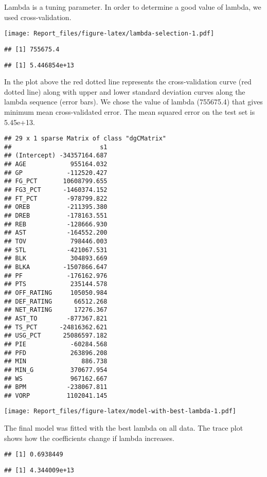 \documentclass[
]{article}
\begin{document}
Lambda is a tuning parameter. In order to determine a good value of
lambda, we used cross-validation.

\texttt{[image: Report\_files/figure-latex/lambda-selection-1.pdf]}

\begin{verbatim}
## [1] 755675.4
\end{verbatim}

\begin{verbatim}
## [1] 5.446854e+13
\end{verbatim}

In the plot above the red dotted line represents the cross-validation
curve (red dotted line) along with upper and lower standard deviation
curves along the lambda sequence (error bars). We chose the value of
lambda (755675.4) that gives minimum mean cross-validated error. The
mean squared error on the test set is 5.45e+13.

\begin{verbatim}
## 29 x 1 sparse Matrix of class "dgCMatrix"
##                        s1
## (Intercept) -34357164.687
## AGE            955164.032
## GP            -112520.427
## FG_PCT       10608799.655
## FG3_PCT      -1460374.152
## FT_PCT        -978799.822
## OREB          -211395.380
## DREB          -178163.551
## REB           -128666.930
## AST           -164552.200
## TOV            798446.003
## STL           -421067.531
## BLK            304893.669
## BLKA         -1507866.647
## PF            -176162.976
## PTS            235144.578
## OFF_RATING     105050.984
## DEF_RATING      66512.268
## NET_RATING      17276.367
## AST_TO        -877367.821
## TS_PCT      -24816362.621
## USG_PCT      25086597.182
## PIE            -60284.568
## PFD            263896.208
## MIN               886.738
## MIN_G          370677.954
## WS             967162.667
## BPM           -238067.811
## VORP          1102041.145
\end{verbatim}

\texttt{[image: Report\_files/figure-latex/model-with-best-lambda-1.pdf]}

The final model was fitted with the best lambda on all data. The trace
plot shows how the coefficients change if lambda increases.

\begin{verbatim}
## [1] 0.6938449
\end{verbatim}

\begin{verbatim}
## [1] 4.344009e+13
\end{verbatim}
\end{document}

